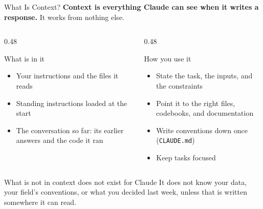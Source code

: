 \documentclass[aspectratio=169, 11pt]{beamer}
\begin{document}

\begin{frame}{What Is Context?}
  \small
  \textbf{Context is everything Claude can see when it writes a response.} It works from nothing else.

  \vspace{0.3em}
  \begin{columns}[T]
    \begin{column}{0.48\textwidth}
      \begin{block}{What is in it}
        \begin{itemize}
          \item Your instructions and the files it reads
          \item Standing instructions loaded at the start
          \item The conversation so far: its earlier answers and the code it ran
        \end{itemize}
      \end{block}
    \end{column}
    \begin{column}{0.48\textwidth}
      \begin{block}{How you use it}
        \begin{itemize}
          \item State the task, the inputs, and the constraints
          \item Point it to the right files, codebooks, and documentation
          \item Write conventions down once (\texttt{CLAUDE.md})
          \item Keep tasks focused
        \end{itemize}
      \end{block}
    \end{column}
  \end{columns}

  \vspace{0.3em}
  \begin{alertblock}{What is not in context does not exist for Claude}
    It does not know your data, your field's conventions, or what you decided last week, unless that is written somewhere it can read.
  \end{alertblock}

\end{frame}
\end{document}
